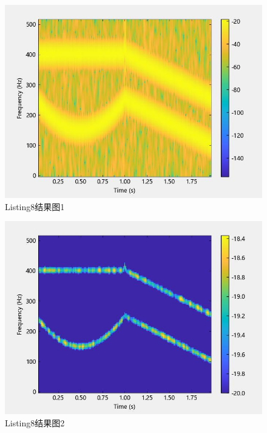 \documentclass{article}
\begin{document}
	\begin{figure}[htbp]
		\centering
		\includegraphics{hw5(8)-1.jpeg}
		\caption{Listing8结果图1}
		\label{fig8-1}
	\end{figure}
	\begin{figure}[htbp]
		\centering
		\includegraphics{hw5(8)-2.jpeg}
		\caption{Listing8结果图2}
		\label{fig8-2}
	\end{figure}
\end{document}
